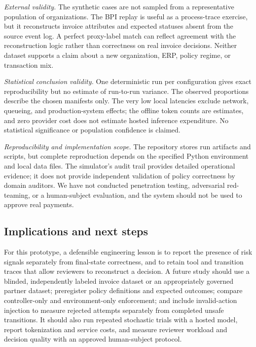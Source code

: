 \documentclass[conference]{IEEEtran}
\begin{document}
\textit{External validity.} The synthetic cases are not sampled from a representative population of organizations. The BPI replay is useful as a process-trace exercise, but it reconstructs invoice attributes and expected statuses absent from the source event log. A perfect proxy-label match can reflect agreement with the reconstruction logic rather than correctness on real invoice decisions. Neither dataset supports a claim about a new organization, ERP, policy regime, or transaction mix.

\textit{Statistical conclusion validity.} One deterministic run per configuration gives exact reproducibility but no estimate of run-to-run variance. The observed proportions describe the chosen manifests only. The very low local latencies exclude network, queueing, and production-system effects; the offline token counts are estimates, and zero provider cost does not estimate hosted inference expenditure. No statistical significance or population confidence is claimed.

\textit{Reproducibility and implementation scope.} The repository stores run artifacts and scripts, but complete reproduction depends on the specified Python environment and local data files. The simulator's audit trail provides detailed operational evidence; it does not provide independent validation of policy correctness by domain auditors. We have not conducted penetration testing, adversarial red-teaming, or a human-subject evaluation, and the system should not be used to approve real payments.

\subsection{Implications and next steps}

For this prototype, a defensible engineering lesson is to report the presence of risk signals separately from final-state correctness, and to retain tool and transition traces that allow reviewers to reconstruct a decision. A future study should use a blinded, independently labeled invoice dataset or an appropriately governed partner dataset; preregister policy definitions and expected outcomes; compare controller-only and environment-only enforcement; and include invalid-action injection to measure rejected attempts separately from completed unsafe transitions. It should also run repeated stochastic trials with a hosted model, report tokenization and service costs, and measure reviewer workload and decision quality with an approved human-subject protocol.
\end{document}
